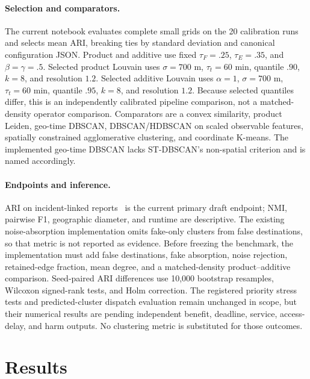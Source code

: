 \documentclass[runningheads]{llncs}
\begin{document}
\paragraph{Selection and comparators.}
The current notebook evaluates complete small grids on the 20 calibration
runs and selects mean ARI, breaking ties by standard deviation and canonical
configuration JSON. Product and additive use fixed $\tau_F=.25$,
$\tau_E=.35$, and $\beta=\gamma=.5$. Selected product Louvain uses
$\sigma=700$ m, $\tau_t=60$ min, quantile $.90$, $k=8$, and resolution $1.2$.
Selected additive Louvain uses $\alpha=1$, $\sigma=700$ m, $\tau_t=60$ min,
quantile $.95$, $k=8$, and resolution $1.2$. Because selected quantiles
differ, this is an independently calibrated pipeline comparison, not a
matched-density operator comparison. Comparators are a convex similarity,
product Leiden, geo-time DBSCAN, DBSCAN/HDBSCAN on scaled observable features,
spatially constrained agglomerative clustering, and coordinate K-means. The
implemented geo-time DBSCAN lacks ST-DBSCAN's non-spatial criterion and is
named accordingly.

\paragraph{Endpoints and inference.}
ARI on incident-linked reports~\cite{hubert1985comparing} is the current
primary draft endpoint; NMI, pairwise F1, geographic diameter, and runtime are
descriptive. The existing noise-absorption implementation omits fake-only
clusters from false destinations, so that metric is not reported as evidence.
Before freezing the benchmark, the implementation must add false destinations,
fake absorption, noise rejection, retained-edge fraction, mean degree, and a
matched-density product--additive comparison. Seed-paired ARI differences use
10,000 bootstrap resamples, Wilcoxon signed-rank tests, and Holm correction.
The registered priority stress tests and predicted-cluster dispatch evaluation
remain unchanged in scope, but their numerical results are pending independent
benefit, deadline, service, access-delay, and harm outputs. No clustering
metric is substituted for those outcomes.

\section{Results}
\end{document}
